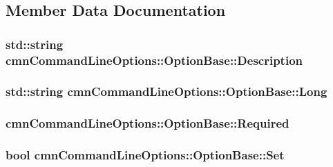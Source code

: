 \subsection{Member Data Documentation}
\hypertarget{classcmn_command_line_options_1_1_option_base_a1500f66c5b609aae2148d84503d802f0}{
\subsubsection[{Description}]{\setlength{\rightskip}{0pt plus 5cm}std\-::string cmn\-Command\-Line\-Options\-::\-Option\-Base\-::\-Description}}\label{classcmn_command_line_options_1_1_option_base_a1500f66c5b609aae2148d84503d802f0}
\hypertarget{classcmn_command_line_options_1_1_option_base_a6f6fcf584fda1640ff1197549e1f660c}{
\subsubsection[{Long}]{\setlength{\rightskip}{0pt plus 5cm}std\-::string cmn\-Command\-Line\-Options\-::\-Option\-Base\-::\-Long}}\label{classcmn_command_line_options_1_1_option_base_a6f6fcf584fda1640ff1197549e1f660c}
\hypertarget{classcmn_command_line_options_1_1_option_base_a053199a52c9a6696fe25af27c0979331}{
\subsubsection[{Required}]{ cmn\-Command\-Line\-Options\-::\-Option\-Base\-::\-Required}}\label{classcmn_command_line_options_1_1_option_base_a053199a52c9a6696fe25af27c0979331}
\hypertarget{classcmn_command_line_options_1_1_option_base_a1bab794e3d379aabf0daf3edaf4abd54}{
\subsubsection[{Set}]{\setlength{\rightskip}{0pt plus 5cm}bool cmn\-Command\-Line\-Options\-::\-Option\-Base\-::\-Set}}\label{classcmn_command_line_options_1_1_option_base_a1bab794e3d379aabf0daf3edaf4abd54}
